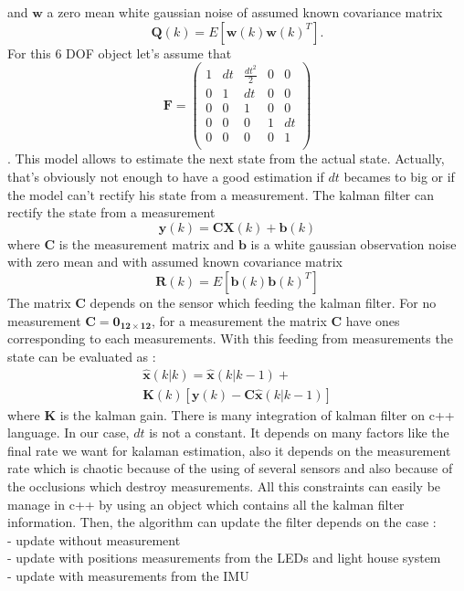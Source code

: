 \documentclass{vldb}
\begin{document}
and $\mathbf{w}$ a zero mean white gaussian noise of assumed known covariance matrix $$ \mathbf{Q}(k) = E[ \mathbf{w}(k) \mathbf{w}(k)^T].$$ For  this 6 DOF object let's assume that $$\mathbf{F}=
\begin{pmatrix}
1 & dt & \frac{dt^2}{2} & 0 & 0 \\
0 & 1 & dt & 0 & 0 \\
0 & 0 & 1 & 0 & 0 \\
0 & 0 & 0 & 1 & dt \\
0 & 0 & 0 & 0 & 1 \\
\end{pmatrix}$$.  This model allows to estimate the next state from the actual state. Actually, that's obviously not enough to have a good estimation if $dt$ becames to big or if the model can't rectify his state from a measurement. The kalman filter can rectify the state from a measurement 
\begin{equation}
\mathbf{y}(k) = \mathbf{C} \mathbf{X}(k) + \mathbf{b}(k)
\end{equation} where $ \mathbf{C}$ is the measurement matrix and $\mathbf{b}$ is a white gaussian observation noise with zero mean and with assumed known covariance matrix
\begin{equation}
\mathbf{R}(k) = E[ \mathbf{b}(k) \mathbf{b}(k)^T]
\end{equation} The matrix $\mathbf{C}$ depends on the sensor which feeding the kalman filter. For no measurement $\mathbf{C} = \mathbf{0_{12 \times 12}}$, for a measurement the matrix $\mathbf{C}$ have ones corresponding to each measurements. With this feeding from measurements the state can be evaluated as :
\begin{equation}
 \begin{matrix}
\hat{\mathbf{x}}(k|k) = \hat{\mathbf{x}}(k|k-1) +\\ \mathbf{K}(k)[\mathbf{y}(k)-\mathbf{C}\hat{\mathbf{x}}(k|k-1)]
\end{matrix}   
\end{equation}
 where $\mathbf{K}$ is the kalman gain. There is many integration of kalman filter on c++ language. In our case, $dt$ is not a constant. It depends on many factors like the final rate we want for kalaman estimation, also it depends on the measurement rate which is chaotic because of the using of several sensors and also because of the occlusions which destroy measurements. All this constraints can easily be manage in c++ by using an object which contains all the kalman filter information. Then, the algorithm can update the filter depends on the case : \\ - update without measurement \\ - update with positions measurements from the LEDs and light house system \\ - update with measurements from the IMU
\end{document}
